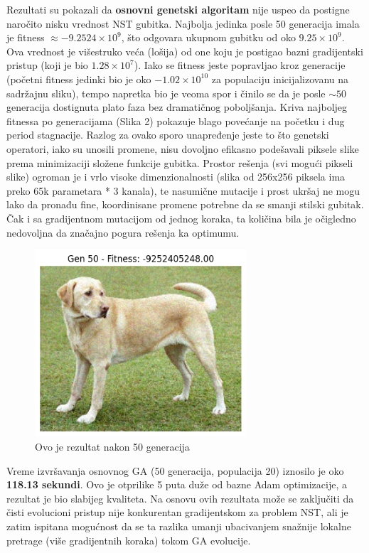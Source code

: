 \documentclass[a4paper,12pt]{article}
\begin{document}
Rezultati su pokazali da \textbf{osnovni genetski algoritam} nije uspeo da postigne naročito nisku vrednost NST gubitka. Najbolja jedinka posle 50 generacija imala je fitness $\approx -9.2524 \times 10^9$, što odgovara ukupnom gubitku od oko $9.25 \times 10^9$. Ova vrednost je višestruko veća (lošija) od one koju je postigao bazni gradijentski pristup (koji je bio $1.28 \times 10^7$). Iako se fitness jeste popravljao kroz generacije (početni fitness jedinki bio je oko $-1.02 \times 10^{10}$ za populaciju inicijalizovanu na sadržajnu sliku), tempo napretka bio je veoma spor i činilo se da je posle $\sim 50$ generacija dostignuta plato faza bez dramatičnog poboljšanja. Kriva najboljeg fitnessa po generacijama (Slika 2) pokazuje blago povećanje na početku i dug period stagnacije. Razlog za ovako sporo unapređenje jeste to što genetski operatori, iako su unosili promene, nisu dovoljno efikasno podešavali piksele slike prema minimizaciji složene funkcije gubitka. Prostor rešenja (svi mogući pikseli slike) ogroman je i vrlo visoke dimenzionalnosti (slika od 256x256 piksela ima preko 65k parametara * 3 kanala), te nasumične mutacije i prost ukršaj ne mogu lako da pronađu fine, koordinisane promene potrebne da se smanji stilski gubitak. Čak i sa gradijentnom mutacijom od jednog koraka, ta količina bila je očigledno nedovoljna da značajno pogura rešenja ka optimumu.

\begin{figure}[h]
\centering
\includegraphics[width=0.7\textwidth]{ga_none.png}
\caption{Ovo je rezultat nakon 50 generacija}
\label{fig:primer_slika}
\end{figure}


Vreme izvršavanja osnovnog GA (50 generacija, populacija 20) iznosilo je oko \textbf{118.13 sekundi}. Ovo je otprilike 5 puta duže od bazne Adam optimizacije, a rezultat je bio slabijeg kvaliteta. Na osnovu ovih rezultata može se zaključiti da čisti evolucioni pristup nije konkurentan gradijentskom za problem NST, ali je zatim ispitana mogućnost da se ta razlika umanji ubacivanjem snažnije lokalne pretrage (više gradijentnih koraka) tokom GA evolucije.
\end{document}
